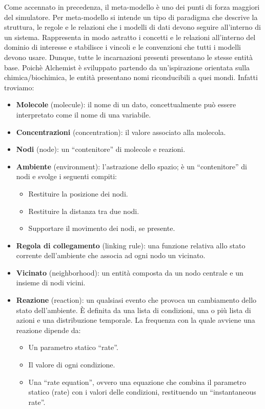 \documentclass[12pt,a4paper,openright,twoside]{book}
\begin{document}
Come accennato in precedenza, il meta-modello è uno dei punti di forza maggiori del simulatore. 
Per meta-modello si intende un tipo di paradigma che descrive la struttura, le regole e le relazioni
che i modelli di dati devono seguire all’interno di un sistema. Rappresenta in modo astratto i 
concetti e le relazioni all’interno del dominio di interesse e stabilisce i vincoli e le convenzioni
che tutti i modelli devono usare. Dunque, tutte le incarnazioni presenti presentano le stesse entità
base. Poichè Alchemist è sviluppato partendo da un’ispirazione orientata sulla chimica/biochimica,
le entità presentano nomi riconducibili a quei mondi. Infatti troviamo:
\begin{itemize}
    \item \textbf{Molecole} (molecule): il nome di un dato, concettualmente può essere interpretato come il nome di una variabile.
    \item \textbf{Concentrazioni} (concentration): il valore associato alla molecola.
    \item \textbf{Nodi} (node): un “contenitore” di molecole e reazioni.
    \item \textbf{Ambiente} (environment): l’astrazione dello spazio; è un “contenitore” di nodi e svolge i seguenti compiti:
    \begin{itemize}
        \item Restituire la posizione dei nodi.
        \item Restituire la distanza tra due nodi.
        \item Supportare il movimento dei nodi, se presente.
    \end{itemize}
    \item \textbf{Regola di collegamento} (linking rule): una funzione relativa allo stato corrente dell’ambiente che associa ad ogni nodo un vicinato.
    \item \textbf{Vicinato} (neighborhood): un entità composta da un nodo centrale e un insieme di nodi vicini.
    \item \textbf{Reazione} (reaction): un qualsiasi evento che provoca un cambiamento dello stato dell’ambiente. È definita da una lista di condizioni, una o più lista di azioni e una distribuzione temporale. La frequenza con la quale avviene una reazione dipende da:
    \begin{itemize}
        \item Un parametro statico “rate”.
        \item Il valore di ogni condizione.
        \item Una “rate equation”, ovvero una equazione che combina il parametro statico (rate) con i valori delle condizioni, restituendo un “instantaneous rate”.

\end{itemize}
\end{itemize}
\end{document}
